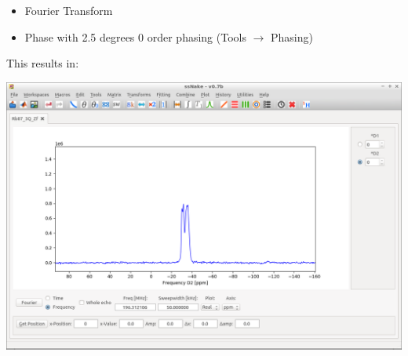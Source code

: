 \documentclass[11pt,a4paper]{article}
\begin{document}
\begin{itemize}
	\item Fourier Transform
	\item Phase with 2.5 degrees 0 order phasing (Tools  $\longrightarrow$ Phasing)
\end{itemize}

This results in:
\begin{center}
\includegraphics[width=0.8\linewidth]{Figs/Fig2.png}
\end{center}
\end{document}

